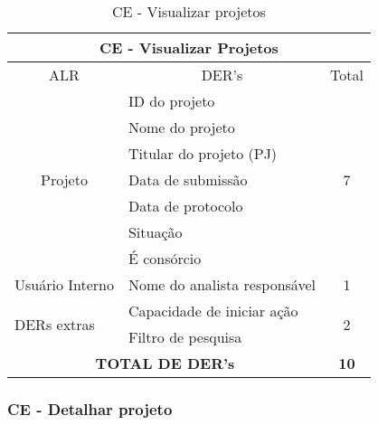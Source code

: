       \begin{table}[!h]
      \centering
      \caption{CE - Visualizar projetos}
      \label{ce_visualizar_projetos}
      \begin{tabular}{|c|l|c|}
      \hline
      \multicolumn{3}{|c|}{CE - Visualizar Projetos}                                                              \\ \hline
      ALR                                                & \multicolumn{1}{c|}{DER's}   & Total              \\ \hline
      \multirow{7}{*}{Projeto}                           & ID do projeto                & \multirow{7}{*}{7} \\ \cline{2-2}
							& Nome do projeto              &                    \\ \cline{2-2}
							& Titular do projeto (PJ)      &                    \\ \cline{2-2}
							& Data de submissão            &                    \\ \cline{2-2}
							& Data de protocolo            &                    \\ \cline{2-2}
							& Situação                     &                    \\ \cline{2-2}
							& É consórcio                  &                    \\ \hline
      Usuário Interno                                   & Nome do analista responsável & 1                  \\ \hline
      \multicolumn{1}{|l|}{\multirow{2}{*}{DERs extras}} & Capacidade de iniciar ação   & \multirow{2}{*}{2} \\ \cline{2-2}
      \multicolumn{1}{|l|}{}                             & Filtro de pesquisa             &                    \\ \hline
      \multicolumn{2}{|c|}{\textbf{TOTAL DE DER's}}                                     & \textbf{10}        \\ \hline
      \end{tabular}
      \end{table}
      
   \subsubsection{CE - Detalhar projeto}
   
